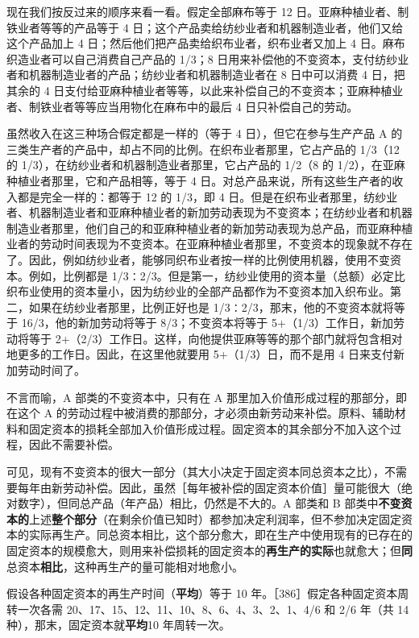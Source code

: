 现在我们按反过来的顺序来看一看。假定全部麻布等于 12 日。亚麻种植业者、制铁业者等等的产品等于 4 日；这个产品卖给纺纱业者和机器制造业者，他们又给这个产品加上 4 日；然后他们把产品卖给织布业者，织布业者又加上 4 日。麻布织造业者可以自己消费自己产品的 1/3；8 日用来补偿他的不变资本，支付纺纱业者和机器制造业者的产品；纺纱业者和机器制造业者在 8 日中可以消费 4 日，把其余的 4 日支付给亚麻种植业者等等，以此来补偿自己的不变资本；亚麻种植业者、制铁业者等等应当用物化在麻布中的最后 4 日只补偿自己的劳动。

虽然收入在这三种场合假定都是一样的（等于 4 日），但它在参与生产产品 A 的三类生产者的产品中，却占不同的比例。在织布业者那里，它占产品的 1/3（12 的 1/3），在纺纱业者和机器制造业者那里，它占产品的 1/2（8 的 1/2），在亚麻种植业者那里，它和产品相等，等于 4 日。对总产品来说，所有这些生产者的收入都是完全一样的：都等于 12 的 1/3，即 4 日。但是在织布业者那里，纺纱业者、机器制造业者和亚麻种植业者的新加劳动表现为不变资本；在纺纱业者和机器制造业者那里，他们自己的和亚麻种植业者的新加劳动表现为总产品，而亚麻种植业者的劳动时间表现为不变资本。在亚麻种植业者那里，不变资本的现象就不存在了。因此，例如纺纱业者，能够同织布业者按一样的比例使用机器，使用不变资本。例如，比例都是 1/3∶2/3。但是第一，纺纱业使用的资本量（总额）必定比织布业使用的资本量小，因为纺纱业的全部产品都作为不变资本加入织布业。第二，如果在纺纱业者那里，比例正好也是 1/3∶2/3，那末，他的不变资本就将等于 16/3，他的新加劳动将等于 8/3；不变资本将等于 5+（1/3）工作日，新加劳动将等于 2+（2/3）工作日。这样，向他提供亚麻等等的那个部门就将包含相对地更多的工作日。因此，在这里他就要用 5+（1/3）日，而不是用 4 日来支付新加劳动时间了。

不言而喻，A 部类的不变资本中，只有在 A 那里加入价值形成过程的那部分，即在这个 A 的劳动过程中被消费的那部分，才必须由新劳动来补偿。原料、辅助材料和固定资本的损耗全部加入价值形成过程。固定资本的其余部分不加入这个过程，因此不需要补偿。

可见，现有不变资本的很大一部分（其大小决定于固定资本同总资本之比），不需要每年由新劳动补偿。因此，虽然［每年被补偿的固定资本价值］量可能很大（绝对数字），但同总产品（年产品）相比，仍然是不大的。A 部类和 B 部类中\textbf{不变资本的}上述\textbf{整个部分}（在剩余价值已知时）都参加决定利润率，但不参加决定固定资本的实际再生产。同总资本相比，这个部分愈大，即在生产中使用现有的已存在的固定资本的规模愈大，则用来补偿损耗的固定资本的\textbf{再生产的实际}也就愈大；但\textbf{同}总资本\textbf{相比}，这种再生产的量可能相对地愈小。

假设各种固定资本的再生产时间（\textbf{平均}）等于 10 年。［386］假定各种固定资本周转一次各需 20、17、15、12、11、10、8、6、4、3、2、1、4/6 和 2/6 年（共 14 种），那末，固定资本就\textbf{平均}10 年周转一次。

